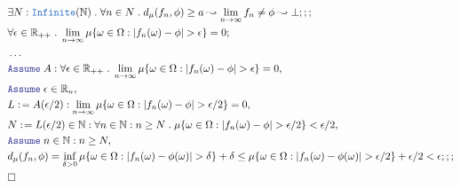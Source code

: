 \documentclass[12pt]{scrartcl}
\newcommand{\TYPE}[1]{\textcolor{NavyBlue}{\mathtt{#1}}}
\newcommand{\LOGIC}[1]{\textcolor{Blue}{\mathtt{#1}}}
\renewcommand{\.}{\; . \;}
\newcommand{\de}{: \kern 0.1pc =}
\newcommand{\Reals}{\mathbb{R} }
\newcommand{\Nat}{\mathbb{N} }
\newcommand{\A}{\LOGIC{Assume} \;}
\renewcommand{\O}{\Omega}
\begin{document}
\begin{align*}
  & \exists N : \TYPE{Infinite}(\Nat) \. \forall n \in N \. d_\mu(f_n,\phi) \ge a \leadsto   \lim_{n \to \infty} f_n \neq \phi \leadsto \bot ;;; \\
  &  \forall \epsilon \in \Reals_{++} \. \lim_{n \to \infty} 
  \mu\{ \omega \in \O :  |f_n(\omega) - \phi | > \epsilon \} =0  ;        \\
&  \ldots  \\
 &  \A  A : \forall \epsilon \in \Reals_{++} \. \lim_{n \to \infty} 
  \mu\{ \omega \in \O :  |f_n(\omega) - \phi | > \epsilon \} = 0  ,  \\
 & \A \epsilon \in \Reals_n, \\
 & L \de A(\epsilon/2) :  
 \lim_{n \to \infty} 
  \mu\{ \omega \in \O :  |f_n(\omega) - \phi | > \epsilon/2 \} = 0,   \\
 &  N \de L(\epsilon/2) \in \Nat : \forall n \in \Nat : n \ge N \.   \mu\{ \omega \in \O :  |f_n(\omega) - \phi | > \epsilon/2 \} < \epsilon/2,   \\
 & \A n \in \Nat : n \ge N, \\
 &  d_\mu(f_n,\phi)  =   \inf_{\delta > 0} \mu\{ \omega \in \O : |f_n(\omega) - \phi(\omega)| > \delta \} + \delta \le    \mu\{ \omega \in \O : |f_n(\omega) - \phi(\omega)| > \epsilon/2 \} + \epsilon/2 < \epsilon ;;;            \\
 & \square \\
\end{align*}
\newpage
\end{document}
